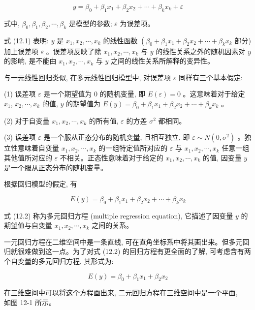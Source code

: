 \documentclass[10pt]{article}
\begin{document}
\begin{CJK*}{UTF8}{bsmi}
\begin{equation*}
y=\beta_{0}+\beta_{1} x_{1}+\beta_{2} x_{2}+\cdots+\beta_{k} x_{k}+\varepsilon \tag{12.1}
\end{equation*}


式中, $\beta_{0}, \beta_{1}, \beta_{2}, \cdots, \beta_{k}$ 是模型的参数; $\varepsilon$ 为误差项。

式 (12.1) 表明: $y$ 是 $x_{1}, x_{2}, \cdots, x_{k}$ 的线性函数 $\left(\beta_{0}+\beta_{1} x_{1}+\beta_{2} x_{2}+\cdots+\beta_{k} x_{k}\right.$ 部分)加上误差项 $\varepsilon$ 。误差项反映了除 $x_{1}, x_{2}, \cdots, x_{k}$ 与 $y$ 的线性关系之外的随机因素对 $y$ 的影响, 是不能由 $x_{1}, x_{2}, \cdots, x_{k}$ 与 $y$ 之间的线性关系所解释的变异性。

与一元线性回归类似, 在多元线性回归模型中, 对误差项 $\varepsilon$ 同样有三个基本假定:

(1) 误差项 $\varepsilon$ 是一个期望值为 0 的随机变量, 即 $E(\varepsilon)=0$ 。这意味着对于给定 $x_{1}$, $x_{2}, \cdots, x_{k}$ 的值, $y$ 的期望值为 $E(y)=\beta_{0}+\beta_{1} x_{1}+\beta_{2} x_{2}+\cdots+\beta_{k} x_{k}$ 。

(2) 对于自变量 $x_{1}, x_{2}, \cdots, x_{k}$ 的所有值, $\varepsilon$ 的方差 $\sigma^{2}$ 都相同。

(3) 误差项 $\varepsilon$ 是一个服从正态分布的随机变量, 且相互独立, 即 $\varepsilon \sim N\left(0, \sigma^{2}\right)$ 。独立性意味着自变量 $x_{1}, x_{2}, \cdots, x_{k}$ 的一组特定值所对应的 $\varepsilon$ 与 $x_{1}, x_{2}, \cdots, x_{k}$ 任意一组其他值所对应的 $\varepsilon$ 不相关。正态性意味着对于给定的 $x_{1}, x_{2}, \cdots, x_{k}$ 的值, 因变量 $y$ 是一个服从正态分布的随机变量。

根据回归模型的假定, 有


\begin{equation*}
E(y)=\beta_{0}+\beta_{1} x_{1}+\beta_{2} x_{2}+\cdots+\beta_{k} x_{k} \tag{12.2}
\end{equation*}


式 (12.2) 称为多元回归方程 (multiple regression equation), 它描述了因变量 $y$ 的期望值与自变量 $x_{1}, x_{2}, \cdots, x_{k}$ 之间的关系。

一元回归方程在二维空间中是一条直线, 可在直角坐标系中将其画出来。但多元回归就很难做到这一点。为了对式 (12.2) 的回归方程有更全面的了解, 可考虑含有两个自变量的多元回归方程, 其形式为:

$$
E(y)=\beta_{0}+\beta_{1} x_{1}+\beta_{2} x_{2}
$$

在三维空间中可以将这个方程画出来, 二元回归方程在三维空间中是一个平面,\\
如图 12-1 所示。


\end{CJK*}
\end{document}
